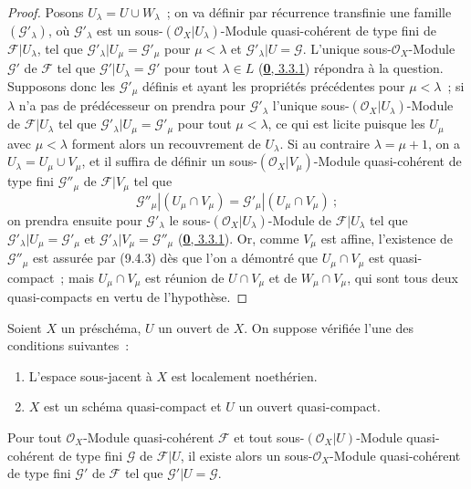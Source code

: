 \begin{proof}
Posons $U_\lambda=U\cup W_\lambda$~; on va définir par récurrence transfinie
une famille $(\mathscr{G}'_\lambda)$, où $\mathscr{G}'_\lambda$ est un
sous-$(\mathscr{O}_X|U_\lambda)$-Module quasi-cohérent de type fini de
$\mathscr{F}|U_\lambda$, tel que
$\mathscr{G}'_\lambda|U_\mu=\mathscr{G}'_\mu$ pour $\mu<\lambda$ et
$\mathscr{G}'_\lambda|U=\mathscr{G}$. L'unique sous-$\mathscr{O}_X$-Module
$\mathscr{G}'$ de $\mathscr{F}$ tel que
$\mathscr{G}'|U_\lambda=\mathscr{G}'$ pour tout $\lambda\in L$
(\hyperref[0.3.3.1-fr]{\textbf{0}, 3.3.1}) répondra à la question. Supposons donc les
$\mathscr{G}'_\mu$ définis et ayant les propriétés précédentes pour
$\mu<\lambda$~; si $\lambda$ n'a pas de prédécesseur on prendra pour
$\mathscr{G}'_\lambda$ l'unique sous-$(\mathscr{O}_X|U_\lambda)$-Module de
$\mathscr{F}|U_\lambda$ tel que
$\mathscr{G}'_\lambda|U_\mu=\mathscr{G}'_\mu$ pour tout $\mu<\lambda$, ce
qui est licite puisque les $U_\mu$ avec $\mu<\lambda$ forment alors un
recouvrement de $U_\lambda$. Si au contraire $\lambda=\mu+1$, on a
$U_\lambda=U_\mu\cup V_\mu$, et il suffira de définir un
sous-$(\mathscr{O}_X|V_\mu)$-Module quasi-cohérent de type fini
$\mathscr{G}''_\mu$ de $\mathscr{F}|V_\mu$ tel que
\[
  \mathscr{G}''_\mu|(U_\mu\cap V_\mu)
  =\mathscr{G}'_\mu|(U_\mu\cap V_\mu)~;
\]
on prendra ensuite pour $\mathscr{G}'_\lambda$ le
sous-$(\mathscr{O}_X|U_\lambda)$-Module de $\mathscr{F}|U_\lambda$ tel que
$\mathscr{G}'_\lambda|U_\mu=\mathscr{G}'_\mu$ et
$\mathscr{G}'_\lambda|V_\mu=\mathscr{G}''_\mu$
(\hyperref[0.3.3.1-fr]{\textbf{0}, 3.3.1}). Or, comme $V_\mu$ est affine, l'existence
de $\mathscr{G}''_\mu$ est assurée par (9.4.3) dès que l'on a démontré que
$U_\mu\cap V_\mu$ est quasi-compact~; mais $U_\mu\cap V_\mu$ est réunion de
$U\cap V_\mu$ et de $W_\mu\cap V_\mu$, qui sont tous deux quasi-compacts en
vertu de l'hypothèse.
\end{proof}

\begin{theorem}[9.4.7]
\label{I.9.4.7-fr}
Soient $X$ un préschéma, $U$ un ouvert de $X$. On suppose vérifiée l'une des
conditions suivantes~:
\begin{enumerate}
  \item[\textup{a)}] L'espace sous-jacent à $X$ est localement noethérien.
  \item[\textup{b)}] $X$ est un schéma quasi-compact et $U$ un ouvert quasi-compact.
\end{enumerate}
Pour tout $\mathscr{O}_X$-Module quasi-cohérent $\mathscr{F}$ et tout
sous-$(\mathscr{O}_X|U)$-Module quasi-cohérent \textup{de type fini} $\mathscr{G}$ de
$\mathscr{F}|U$, il existe alors un sous-$\mathscr{O}_X$-Module
quasi-cohérent \textup{de type fini} $\mathscr{G}'$ de $\mathscr{F}$ tel que
$\mathscr{G}'|U=\mathscr{G}$.
\end{theorem}

